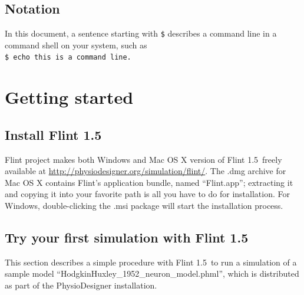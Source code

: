 \documentclass[a4paper,10pt]{report}
\def\FlintVersion{1.5}
\def\Flint{Flint \FlintVersion}
\begin{document}
\section{Notation}
In this document, a sentence starting with {\tt \$} describes a command line in
a command shell on your system, such as\\
{\tt \$ echo this is a command line.}



\chapter{Getting started}

\section{Install \Flint}
Flint project makes both Windows and Mac OS X version of \Flint\ freely
available at \url{http://physiodesigner.org/simulation/flint/}.
The .dmg archive for Mac OS X contains Flint's application bundle, named
``Flint.app''; extracting it and copying it into your favorite path is all
you have to do for installation.
For Windows, double-clicking the .msi package will start the installation
process.

\section{Try your first simulation with \Flint}
This section describes a simple procedure with \Flint\ to run a simulation of a
sample model ``HodgkinHuxley\_1952\_neuron\_model.phml'', which is distributed
as part of the PhysioDesigner installation.
\end{document}
